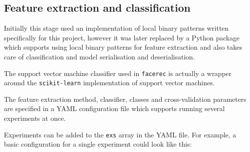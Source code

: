 \subsection{Feature extraction and classification}
Initially this stage used an implementation of local binary patterns written
specifically for this project, however it was later replaced by a Python
package \citep{facerec} which supports using local binary patterns for feature
extraction and also takes care of classification and model serialisation and
deserialisation.

The support vector machine classifier used in \texttt{facerec} is actually a
wrapper around the \texttt{scikit-learn} implementation of support vector
machines.

The feature extraction method, classifier, classes and cross-validation
parameters are specified in a YAML configuration file which supports running
several experiments at once. 

Experiments can be added to the \texttt{exs} array in the YAML file. For
example, a basic configuration for a single experiment could look like this:

